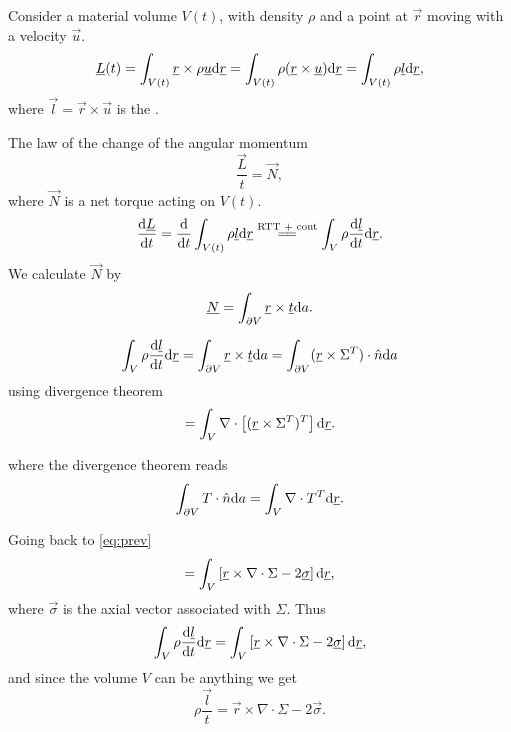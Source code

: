 \documentclass[../main.tex]{subfiles}
\begin{document}
    Consider a material volume $V(t)$, with density $\rho$ and a point at $\vec r$ moving with a velocity $\vec u$.
    \begin{displaymath}
      \underline{L} (t) = \int_{V(t)}\underline{r} \times \rho \underline{u} \mathrm{d} \underline{r}
      = \int_{V(t)} \rho (\underline{r} \times \underline{u}) \mathrm{d} \underline{r}
      = \int_{V(t)} \rho \underline{l} \mathrm{d} \underline{r},
    \end{displaymath}
    where $\vec l = \vec r \times \vec u $ is the .

    The law of the change of the angular momentum
    \begin{displaymath}
      \dfrac{ \vec L }{t} = \vec N,
    \end{displaymath}
    where $\vec N$ is a net torque acting on $V(t)$.
    \begin{displaymath}
      \dfrac{\vec L}{t} = \dfrac{}{t} \int_{V(t)} \rho \vec l \d \vec r \os{\tm{RTT + cont}}{=\joinrel=} \int_V \rho \dfrac{\vec l}{t} \d \vec r.
    \end{displaymath}
    We calculate $\vec N$ by
    \begin{displaymath}
      \underline{N} = \int_{\partial V} \underline{r} \times\underline{t} \mathrm{d} a.
    \end{displaymath}

    \begin{displaymath}
      \int_V \rho \frac{\mathrm{d} \underline{l}}{\mathrm{d} t} \mathrm{d} \underline{r} = \int_{\partial V} \underline{r} \times \underline{t} \mathrm{d} a 
      = \int_{\partial V} (\underline{r} \times \Sigma^T) \cdot \hat n \mathrm{d} a 
    \end{displaymath}
    using divergence theorem
    \begin{equation}
      = \int_V \nabla \cdot \left[ ( \underline{r} \times \Sigma^T)^T \right] \mathrm{d} \underline{r}.
      \label{eq:prev}
    \end{equation}

    where the divergence theorem reads
    \begin{displaymath}
      \int_{\partial V} T \cdot \hat n \mathrm{d} a = \int_V \nabla \cdot T^T  \mathrm{d} \underline{r}.
    \end{displaymath}

    Going back to \ref{eq:prev}
    \begin{displaymath}
       = \int_V \left[ \underline{r} \times \nabla \cdot \Sigma - 2 \underline{\sigma} \right] \mathrm{d} \underline{r},
    \end{displaymath}
    where $\vec \sigma $ is the axial vector associated with $\Sigma$.
    Thus
    \begin{displaymath}
      \int_V \rho \frac{\mathrm{d}  \underline{l}}{\mathrm{d} t} \mathrm{d} \underline{r} = \int_V \left[ \underline{r} \times \nabla \cdot \Sigma - 2 \underline{\sigma} \right] \mathrm{d} \underline{r} ,
    \end{displaymath}
    and since the volume $V$ can be anything we get
    \begin{equation}
      \rho \dfrac{ \vec l }{t} = \vec r \times \nabla \cdot \Sigma - 2 \vec \sigma.
      \label{eq:2.2}
    \end{equation}
\end{document}
